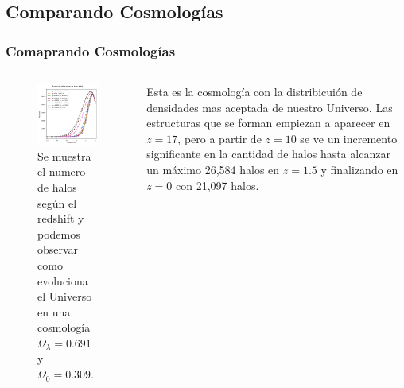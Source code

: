 \documentclass{beamer}
\begin{document}
\subsection{Comparando Cosmologías}
	\begin{frame}
		\frametitle{Comaprando Cosmologías}
		\begin{columns}[t]
           	\begin{column}{.5\textwidth}

				\begin{figure}
					\centering
					\includegraphics[scale=0.3]{Conc/TotalHalos_Conc.png}
					\caption{\footnotesize Se muestra el numero de halos según el redshift y podemos observar como evoluciona el Universo en una cosmología $\Omega_\lambda = 0.691 $ y $\Omega_0 = 0.309$.}
					\label{fig:TotalHalos_Conc}
				\end{figure}

	        \end{column}
			\vspace{0.5cm}
    	    \begin{column}{.5\textwidth}

    	    	Esta es la cosmología con la distribicuión de densidades mas aceptada de nuestro Universo. Las estructuras que se forman empiezan a aparecer en $z=17$, pero a partir de $z=10$ se ve un incremento significante en la cantidad de halos hasta alcanzar un máximo 26,584 halos en $z = 1.5$ y finalizando en $z=0$ con 21,097 halos.

        	\end{column}
	    \end{columns}

	\end{frame}
\end{document}
